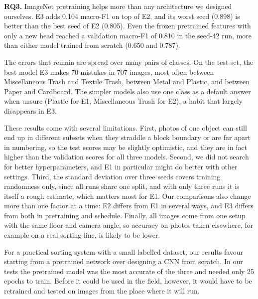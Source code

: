 \documentclass{article}
\begin{document}
\textbf{RQ3.} ImageNet pretraining helps more than any architecture we designed ourselves. E3 adds 0.104 macro-F1 on top of E2, and its worst seed (0.898) is better than the best seed of E2 (0.805). Even the frozen pretrained features with only a new head reached a validation macro-F1 of 0.810 in the seed-42 run, more than either model trained from scratch (0.650 and 0.787).

The errors that remain are spread over many pairs of classes. On the test set, the best model E3 makes 70 mistakes in 707 images, most often between Miscellaneous Trash and Textile Trash, between Metal and Plastic, and between Paper and Cardboard. The simpler models also use one class as a default answer when unsure (Plastic for E1, Miscellaneous Trash for E2), a habit that largely disappears in E3.

These results come with several limitations. First, photos of one object can still end up in different subsets when they straddle a block boundary or are far apart in numbering, so the test scores may be slightly optimistic, and they are in fact higher than the validation scores for all three models. Second, we did not search for better hyperparameters, and E1 in particular might do better with other settings. Third, the standard deviation over three seeds covers training randomness only, since all runs share one split, and with only three runs it is itself a rough estimate, which matters most for E1. Our comparisons also change more than one factor at a time: E2 differs from E1 in several ways, and E3 differs from both in pretraining and schedule. Finally, all images come from one setup with the same floor and camera angle, so accuracy on photos taken elsewhere, for example on a real sorting line, is likely to be lower.

For a practical sorting system with a small labelled dataset, our results favour starting from a pretrained network over designing a CNN from scratch. In our tests the pretrained model was the most accurate of the three and needed only 25 epochs to train. Before it could be used in the field, however, it would have to be retrained and tested on images from the place where it will run.
\end{document}
